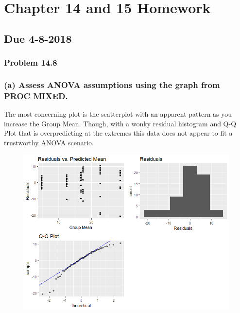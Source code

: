 \documentclass{article}
\begin{document}
\section*{Chapter 14 and 15 Homework}
\subsection*{Due 4-8-2018}
\subsubsection*{Problem 14.8}
\subsubsection*{ (a) Assess ANOVA assumptions using the graph from PROC MIXED.}
The most concerning plot is the scatterplot with an apparent pattern as you increase the Group Mean.  Though, with a wonky residual histogram and Q-Q Plot that is overpredicting at the extremes this data does not appear to fit a trustworthy ANOVA scenario.  
\begin{figure}[h]
\centering
\includegraphics[width = 1.0\textwidth]{ANOVAcheck148.png}
\end{figure}
\pagebreak
\end{document}
